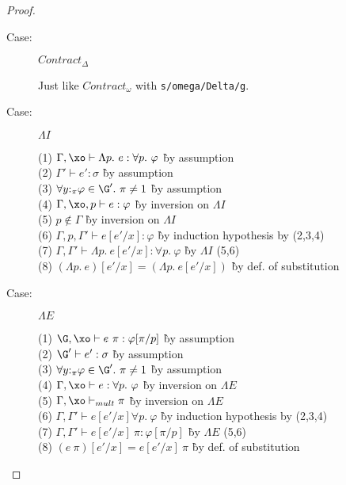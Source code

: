 \begin{proof}
\begin{description}
\item[Case:] $Contract_\Delta$
\begin{tabbing}
  Just like $Contract_\omega$ with \texttt{s/omega/Delta/g}.
\end{tabbing}

\item[Case:] $\Lambda I$
\begin{tabbing}
  (1) $\Gamma, \xo \vdash \Lambda p.~e : \forall p.~\varphi$ \` by assumption\\
  (2) $\Gamma' \vdash e' : \sigma$ \` by assumption\\
  (3) $\hasnolinearvars{\G'}$ \` by assumption\\
  (4) $\Gamma, \xo, p \vdash e : \varphi$ \` by inversion on $\Lambda I$\\
  (5) $p \notin \Gamma$ \` by inversion on $\Lambda I$\\
  (6) $\Gamma, p, \Gamma' \vdash e[e'/x] : \varphi$ \` by induction hypothesis by (2,3,4)\\
  (7) $\Gamma, \Gamma' \vdash \Lambda p.~e[e'/x] : \forall p.~\varphi$ \` by $\Lambda I$ (5,6)\\
  (8) $(\Lambda p.~e)[e'/x] = (\Lambda p.~e[e'/x])$ \` by def. of substitution\\
\end{tabbing}

\item[Case:] $\Lambda E$
\begin{tabbing}
  (1) $\G, \xo \vdash e~\pi: \varphi[\pi/p]$ \` by assumption\\
  (2) $\G' \vdash e' : \sigma$ \` by assumption\\
  (3) $\hasnolinearvars{\G'}$ \` by assumption\\
  (4) $\Gamma, \xo \vdash e : \forall p.~\varphi$ \` by inversion on $\Lambda E$\\
  (5) $\Gamma, \xo \vdash_{mult} \pi$ \` by inversion on $\Lambda E$\\
  (6) $\Gamma, \Gamma' \vdash e[e'/x] \forall p.~\varphi$ \` by induction hypothesis by (2,3,4)\\
  (7) $\Gamma, \Gamma' \vdash e[e'/x]~\pi : \varphi[\pi/p]$ \` by $\Lambda E$ (5,6)\\
  (8) $(e~\pi)[e'/x] = e[e'/x]~\pi$ \` by def. of substitution\\
\end{tabbing}


\end{description}
\end{proof}

